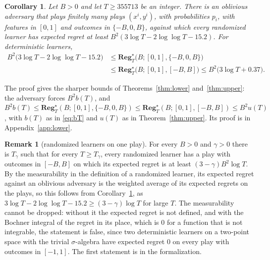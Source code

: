 \documentclass[12pt]{amsart}
\newtheorem{corollary}[theorem]{Corollary}
\theoremstyle{definition}
\newtheorem{remark}[theorem]{Remark}
\numberwithin{equation}{section}
\newcommand{\Regs}{\mathbf{Reg}^{\star}}
\newcommand{\leanmap}[1]{\ignorespaces}
\newcommand{\mapnote}[1]{\ignorespaces}
\begin{document}
\begin{corollary}\label{cor:bounded}
\leanmap{RegretKappa.mainBoundedFeatures, RegretKappa.Corollaries.boundedFeatures_of_mixture,
  RegretKappa.Corollaries.le_advRegret}
\mapnote{Lean states it as \lname{RegretKappa.MainBoundedFeatures}, with the two minimax regrets \lname{RegretKappa.Corollaries.minimaxRegretBF} and \lname{RegretKappa.Corollaries.minimaxRegretBFI} in the extended real numbers, for randomized learners on probability spaces in every universe. The sharper form of the sentence after the corollary, with $B^2b(T)$ and $B^2u(T)$, is \lname{RegretKappa.mainBoundedFeaturesChain} (\lname{RegretKappa.MainBoundedFeaturesChain}).}
Let $B>0$ and let $T\ge355713$ be an integer. There is an oblivious adversary that plays finitely many plays $(x^i,y^i)$, with probabilities $p_i$, with features in $[0,1]$ and outcomes in $\{-B,0,B\}$, against which every randomized learner has expected regret at least $B^2(3\log T-2\log\log T-15.2)$. For deterministic learners,
\begin{align*}
B^2\bigl(3\log T-2\log\log T-15.2\bigr)&\le\Regs_T\bigl(B;[0,1],\{-B,0,B\}\bigr)\\
&\le\Regs_T\bigl(B;[0,1],[-B,B]\bigr)\le B^2\bigl(3\log T+0.37\bigr).
\end{align*}
\end{corollary}

The proof gives the sharper bounds of Theorems~\ref{thm:lower} and~\ref{thm:upper}: the adversary forces $B^2b(T)$, and $B^2b(T)\le\Regs_T(B;[0,1],\{-B,0,B\})\le\Regs_T(B;[0,1],[-B,B])\le B^2u(T)$, with $b(T)$ as in \eqref{eq:bT} and $u(T)$ as in Theorem~\ref{thm:upper}. Its proof is in Appendix~\ref{app:lower}.

\begin{remark}[randomized learners on one play]\label{rem:rand}
\leanmap{RegretKappa.randLowerBound, RegretKappa.CorollariesCheck.V42b.not_randLowerBound}
\mapnote{Lean states it as \lname{RegretKappa.Corollaries.RandLowerBound} and proves it from Corollary~\ref{cor:bounded}; the reading with the Bochner integral and no measurability is refuted by \lname{RegretKappa.CorollariesCheck.V42b.not_randLowerBound}, with the learner of \lname{RegretKappa.CorollariesCheck.integral_famBot}.}
For every $B>0$ and $\gamma>0$ there is $T_\gamma$ such that for every $T\ge T_\gamma$, every randomized learner has a play with outcomes in $[-B,B]$ on which its expected regret is at least $(3-\gamma)B^2\log T$. By the measurability in the definition of a randomized learner, its expected regret against an oblivious adversary is the weighted average of its expected regrets on the plays, so this follows from Corollary~\ref{cor:bounded}, as $3\log T-2\log\log T-15.2\ge(3-\gamma)\log T$ for large $T$. The measurability cannot be dropped: without it the expected regret is not defined, and with the Bochner integral of the regret in its place, which is $0$ for a function that is not integrable, the statement is false, since two deterministic learners on a two-point space with the trivial $\sigma$-algebra have expected regret $0$ on every play with outcomes in $[-1,1]$. The first statement is  in the formalization.
\end{remark}
\end{document}
